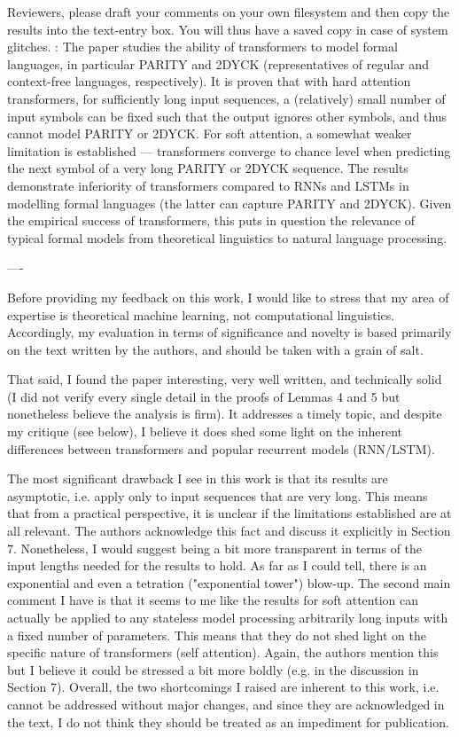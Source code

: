 \documentclass[11pt,a4paper]{article}
\begin{document}
Reviewers, please draft your comments on your own filesystem and then copy
the results into the text-entry box.  You will thus have a saved copy in
case of system glitches.
:
        The paper studies the ability of transformers to model formal languages, in
particular PARITY and 2DYCK (representatives of regular and context-free
languages, respectively).  It is proven that with hard attention
transformers, for sufficiently long input sequences, a (relatively) small
number of input symbols can be fixed such that the output ignores other
symbols, and thus cannot model PARITY or 2DYCK.  For soft attention, a
somewhat weaker limitation is established --- transformers converge to
chance level when predicting the next symbol of a very long PARITY or 2DYCK
sequence.  The results demonstrate inferiority of transformers compared to
RNNs and LSTMs in modelling formal languages (the latter can capture PARITY
and 2DYCK).  Given the empirical success of transformers, this puts in
question the relevance of typical formal models from theoretical linguistics
to natural language processing.

----

Before providing my feedback on this work, I would like to stress that my
area of expertise is theoretical machine learning, not computational
linguistics.  Accordingly, my evaluation in terms of significance and
novelty is based primarily on the text written by the authors, and should be
taken with a grain of salt.

That said, I found the paper interesting, very well written, and technically
solid (I did not verify every single detail in the proofs of Lemmas 4 and 5
but nonetheless believe the analysis is firm).  It addresses a timely topic,
and despite my critique (see below), I believe it does shed some light on
the inherent differences between transformers and popular recurrent models
(RNN/LSTM).

The most significant drawback I see in this work is that its results are
asymptotic, i.e. apply only to input sequences that are very long.  This
means that from a practical perspective, it is unclear if the limitations
established are at all relevant.  The authors acknowledge this fact and
discuss it explicitly in Section 7.  Nonetheless, I would suggest being a
bit more transparent in terms of the input lengths needed for the results to
hold.  As far as I could tell, there is an exponential and even a tetration
("exponential tower") blow-up.  The second main comment I have is that it
seems to me like the results for soft attention can actually be applied to
any stateless model processing arbitrarily long inputs with a fixed number
of parameters.  This means that they do not shed light on the specific
nature of transformers (self attention).  Again, the authors mention this
but I believe it could be stressed a bit more boldly (e.g. in the discussion
in Section 7).  Overall, the two shortcomings I raised are inherent to this
work, i.e. cannot be addressed without major changes, and since they are
acknowledged in the text, I do not think they should be treated as an
impediment for publication.
\end{document}
